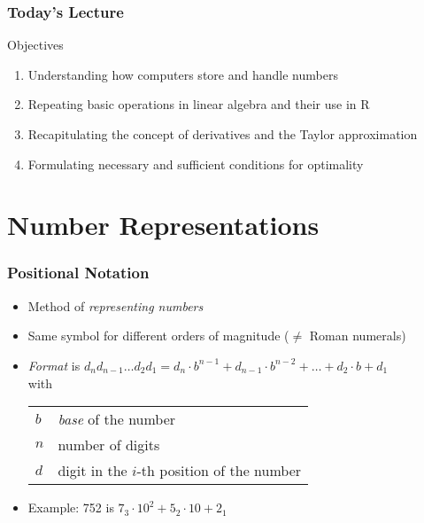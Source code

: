 \documentclass[%
  final,
  11pt, 
  show notes, %
  t, %
  fleqn, %
]{beamer}
\begin{document}
  
  
\begin{frame}
  \frametitle{Today's Lecture}
\vfill
\begin{block}{Objectives}
\begin{enumerate}
\item Understanding how computers store and handle numbers
\item Repeating basic operations in linear algebra and their use in R
\item Recapitulating the concept of derivatives and the Taylor approximation
\item Formulating necessary and sufficient conditions for optimality
\end{enumerate}
\end{block}
\vfill
\end{frame}
  
  

\section{Number Representations}

\begin{frame}
  \frametitle{Positional Notation}
\begin{itemize}
\item Method of \emph{representing numbers}
\item Same symbol for different orders of magnitude ($\neq$ Roman numerals)
\item \emph{Format} is $d_n d_{n-1} \ldots d_2 d_1 =  d_n \cdot b^{n-1} + d_{n-1} \cdot b^{n-2} + \ldots + d_2 \cdot b + d_1$ \\
with\\
\qquad
\begin{tabular}{ll}
$b$ & \emph{base} of the number \\
$n$ & number of digits \\
$d$ & digit in the $i$-th position of the number\\
\end{tabular} 
\item Example: 752 is $7_3 \cdot 10^2 + 5_2 \cdot 10 + 2_1$
\end{itemize}
\end{frame}
\end{document}

